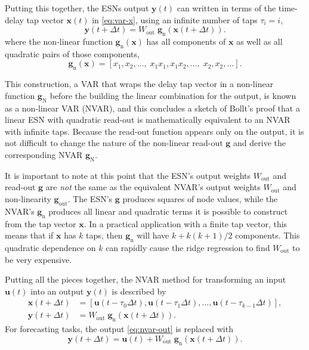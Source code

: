 Putting this together, the ESNs output $\bm{y}(t)$ can written in
terms of the time-delay tap vector $\bm{x}(t)$ in \cref{eq:var-x},
using an infinite number of taps $\tau_i = i$,
\begin{equation}
  \bm{y}(t + \Delta t) = W_\text{out}\;\bm{g}_\text{n}\left(\bm{x}(t + \Delta t)\right).
\end{equation}
where the non-linear function $\bm{g}_\text{n}(\bm{x})$ has all
components of $\bm{x}$ as well as all quadratic pairs of those components,
\begin{equation}
  \label{eq:quadratic-nvar}
  \bm{g}_\text{n}(\bm{x}) = [x_1, x_2, \dots, \; x_1 x_1, x_1 x_2, \dots, \; x_2, x_2, \dots].
\end{equation}

This construction, a VAR that wraps the delay tap vector in a
non-linear function $\bm{g}_\text{N}$ before the building the linear
combination for the output, is known as a non-linear VAR (NVAR), and
this concludes a sketch of Bollt's proof that a linear ESN with
quadratic read-out is mathematically equivalent to an NVAR with
infinite taps\cite{bollt2021}. Because the read-out function appears
only on the output, it is not difficult to change the nature of the
non-linear read-out $\bm{g}$ and derive the corresponding NVAR
$\bm{g}_\text{N}$.

It is important to note at this point that the ESN's output weights
$W_\text{out}$ and read-out $\bm{g}$ are \emph{not} the same as the
equivalent NVAR's output weights $W_\text{out}$ and non-linearity
$\bm{g}_\text{out}$. The ESN's $\bm{g}$ produces squares of node
values, while the NVAR's $\bm{g}_\text{n}$ produces all linear and
quadratic terms it is possible to construct from the tap vector
$\bm{x}$. In a practical application with a finite tap vector, this
means that if $\bm{x}$ has $k$ taps, then $\bm{g}_\text{n}$ will have
$k + k(k+1)/2$ components. This quadratic dependence on $k$ can
rapidly cause the ridge regression to find $W_\text{out}$ to be very
expensive.

Putting all the pieces together, the NVAR method for transforming an
input $\bm{u}(t)$ into an output $\bm{y}(t)$ is described by
\begin{align}
  \label{eq:nvar}
  \bm{x}(t + \Delta t) &= [\bm{u}(t - \tau_0 \Delta t), \bm{u}(t - \tau_1 \Delta t), \dots, \bm{u}(t - \tau_{k-1} \Delta t)], \\
  \label{eq:nvar-out}
  \bm{y}(t + \Delta t) &= W_\text{out}\;\bm{g}_\text{n}\left(\bm{x}(t + \Delta t)\right).
\end{align}
For forecasting tasks, the output \cref{eq:nvar-out} is replaced with
\begin{equation}
  \label{eq:nvar-out-forecast}
  \bm{y}(t + \Delta t) = \bm{u}(t) + W_\text{out}\;\bm{g}_\text{n}\left(\bm{x}(t + \Delta t)\right).
\end{equation}

